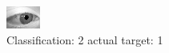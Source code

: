 \begin{figure}[h!]
\begin{center}
\includegraphics[width=0.60\columnwidth]{figures/ID2731_class_2_target_1.png}
\end{center}
\caption{ Classification: 2 actual target: 1}
\label{fig:ID2731_class_2_target_1}
\end{figure}
